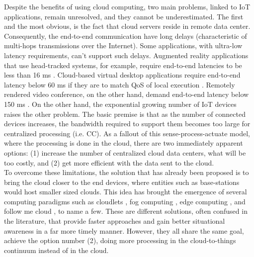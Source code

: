 \noindent\tab Despite the benefits of using cloud computing, two main problems, linked to IoT applications, remain unresolved, and they cannot be underestimated. The first and the most obvious, is the fact that cloud servers reside in remote data center. Consequently, the end-to-end communication have long delays (characteristic of multi-hops transmissions over the Internet). Some applications, with ultra-low latency requirements, can't support such delays. Augmented reality applications that use head-tracked systems, for example, require end-to-end latencies to be less than 16 ms \cite{ellis2004generalizeability}. Cloud-based virtual desktop applications require end-to-end latency below 60 ms if they are to match QoS of local execution \cite{taylor2015virtual}. Remotely rendered video conference, on the other hand, demand end-to-end latency below 150 ms \cite{szigeti2005end}. On the other hand, the exponential growing number of IoT devices raises the other problem. The basic premise is that as the number of connected devices increases, the bandwidth required to support them becomes too large for centralized processing (i.e. CC). As a fallout of this sense-process-actuate model, where the processing is done in the cloud, there are two immediately apparent options: (1) increase the number of centralized cloud data centers, what will be too costly, and (2) get more efficient with the data sent to the cloud.\\
\noindent\tab To overcome these limitations, the solution that has already been proposed is to bring the cloud closer to the end devices, where entities such as base-stations would host smaller sized clouds. This idea has brought the emergence of several computing paradigms such as cloudlets \cite{satyanarayanan2013cloudlets}, fog computing \cite{bonomi2012fog}, edge computing \cite{davy2014challenges}, and follow me cloud \cite{taleb2013follow}, to name a few. These are different solutions, often confused in the literature, that provide faster approaches and gain better situational awareness in a far more timely manner. However, they all share the same goal, achieve the option number (2), doing more processing in the cloud-to-things continuum instead of in the cloud.\\
